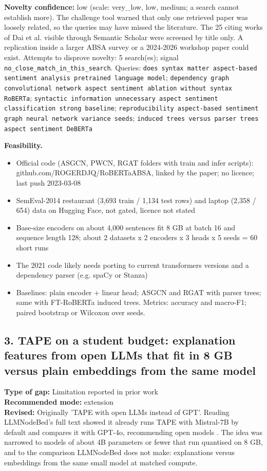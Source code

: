 \documentclass[11pt,a4paper]{article}
\begin{document}
\textbf{Novelty confidence:} low (scale: very\_low, low, medium; a search cannot establish more). The challenge tool warned that only one retrieved paper was loosely related, so the queries may have missed the literature. The 25 citing works of Dai et al. visible through Semantic Scholar were screened by title only. A replication inside a larger ABSA survey or a 2024-2026 workshop paper could exist.
Attempts to disprove novelty: 5 search(es); signal \texttt{no\_close\_match\_in\_this\_search}. Queries: \texttt{does syntax matter aspect-based sentiment analysis pretrained language model}; \texttt{dependency graph convolutional network aspect sentiment ablation without syntax RoBERTa}; \texttt{syntactic information unnecessary aspect sentiment classification strong baseline}; \texttt{reproducibility aspect-based sentiment graph neural network variance seeds}; \texttt{induced trees versus parser trees aspect sentiment DeBERTa}

\textbf{Feasibility.}
\begin{itemize}
\item [V] Official code (ASGCN, PWCN, RGAT folders with train and infer scripts): github.com/ROGERDJQ/RoBERTaABSA, linked by the paper; no licence; last push 2023-03-08
\item [V] SemEval-2014 restaurant (3,693 train / 1,134 test rows) and laptop (2,358 / 654) data on Hugging Face, not gated, licence not stated
\item [E] Base-size encoders on about 4,000 sentences fit 8 GB at batch 16 and sequence length 128; about 2 datasets x 2 encoders x 3 heads x 5 seeds = 60 short runs
\item [E] The 2021 code likely needs porting to current transformers versions and a dependency parser (e.g. spaCy or Stanza)
\item [S] Baselines: plain encoder + linear head; ASGCN and RGAT with parser trees; same with FT-RoBERTa induced trees. Metrics: accuracy and macro-F1; paired bootstrap or Wilcoxon over seeds.
\end{itemize}

\subsection{3. TAPE on a student budget: explanation features from open LLMs that fit in 8 GB versus plain embeddings from the same model}
\textbf{Type of gap:} Limitation reported in prior work\\
\textbf{Recommended mode:} extension\\
\textbf{Revised:} Originally 'TAPE with open LLMs instead of GPT'. Reading LLMNodeBed's full text showed it already runs TAPE with Mistral-7B by default and compares it with GPT-4o, recommending open models \cite{wu2025llmnodebed}. The idea was narrowed to models of about 4B parameters or fewer that run quantised on 8 GB, and to the comparison LLMNodeBed does not make: explanations versus embeddings from the same small model at matched compute.
\end{document}
